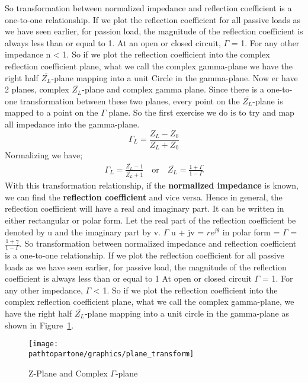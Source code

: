 So transformation between normalized impedance and reflection coefficient is a one-to-one relationship. If we plot the reflection coefficient for all passive loads as we have seen earlier, for passion load, the magnitude of the reflection coefficient is always less than or equal to 1. At an open or closed circuit, $\Gamma$ = 1. For any other impedance n < 1. So if we plot the reflection coefficient into the complex reflection coefficient plane, what we call the complex gamma-plane we have the right half $\bar{Z_L}$-plane mapping into a unit Circle in the gamma-plane. Now er have 2 planes, complex $\bar{Z_L}$-plane and complex gamma plane. Since there is a one-to-one transformation between these two planes, every point on the $\bar{Z_L}$-plane is mapped to a point on the $\Gamma$ plane. So the first exercise we do is to try and map all impedance into the gamma-plane.
\begin{equation}
\Gamma_L = \frac{Z_L - Z_0}{Z_L + Z_0}\label{eqn:refcoefficientfromload07}
\end{equation}
Normalizing we have;
\begin{align*}
\Gamma_L = \frac{\bar{Z_L} - 1}{\bar{Z_L} + 1}\quad\text{or}\quad\bar{Z_L}= \frac{1 + \Gamma}{1 - \Gamma}
\end{align*}
With this transformation relationship, if the \textbf{normalized impedance} is known, we can find the \textbf{reflection coefficient} and vice versa. Hence in general, the reflection coefficient will have a real and imaginary part. It can be written in either rectangular or polar form. Let the real part of the reflection coefficient be denoted by u and the imaginary part by v. $\Gamma$ u + jv = $re^{j\theta}$ in polar form = $\Gamma$ = $\frac{1 + \gamma}{1-\Gamma}$. So transformation between normalized impedance and reflection coefficient is a one-to-one relationship. If we plot the reflection coefficient for all passive loads as we have seen earlier, for passive load, the magnitude of the reflection coefficient is always less than or equal to 1 At open or closed circuit $\Gamma$ = 1. For any other impedance, $\Gamma$ < 1. So if we plot the reflection coefficient into the complex reflection coefficient plane, what we call the complex gamma-plane, we have the right half $\bar{Z_L}$-plane mapping into a unit circle in the gamma-plane as shown in Figure~\ref{fig:oiuhgvcx}.
\begin{figure}[h]
\centering
\texttt{[image: \\pathtopartone/graphics/plane\_transform]}
\caption{Z-Plane and Complex $\Gamma$-plane}
\label{fig:oiuhgvcx}
\end{figure}

